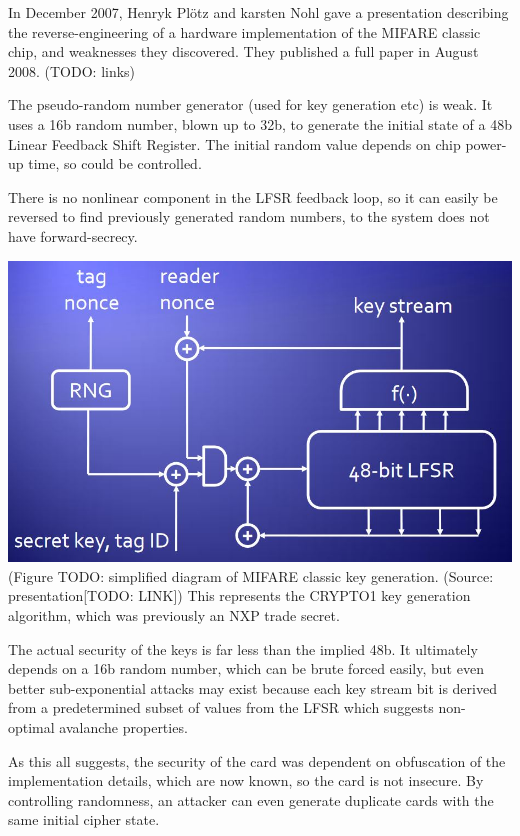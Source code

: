 \documentclass[12pt]{article}
\begin{document}
In December 2007, Henryk Pl\"otz and karsten Nohl gave a presentation describing the reverse-engineering of a hardware implementation of the MIFARE classic chip, and weaknesses they discovered. They published a full paper in August 2008. (TODO: links)

The pseudo-random number generator (used for key generation etc) is weak. It uses a 16b random number, blown up to 32b, to generate the initial state of a 48b Linear Feedback Shift Register. The initial random value depends on chip power-up time, so could be controlled. 

There is no nonlinear component in the LFSR feedback loop, so it can easily be reversed to find previously generated random numbers, to the system does not have forward-secrecy.

\includegraphics[scale=0.5]{introduction/mifare_classic.jpg}\\
(Figure TODO: simplified diagram of MIFARE classic key generation. (Source: presentation[TODO: LINK]) This represents the CRYPTO1 key generation algorithm, which was previously an NXP trade secret.

The actual security of the keys is far less than the implied 48b. It ultimately depends on a 16b random number, which can be brute forced easily, but even better sub-exponential attacks may exist because each key stream bit is derived from a predetermined subset of values from the LFSR which suggests non-optimal avalanche properties. %

As this all suggests, the security of the card was dependent on obfuscation of the implementation details, which are now known, so the card is not insecure. By controlling randomness, an attacker can even generate duplicate cards with the same initial cipher state.
\end{document}
